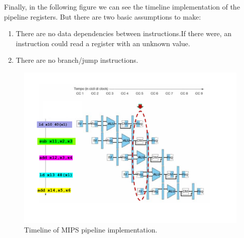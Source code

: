 \documentclass[a4paper]{article}
\begin{document}
    \noindent
    Finally, in the following figure we can see the timeline implementation of the pipeline registers. But there are two basic assumptions to make:
    \begin{enumerate}
        \item There are no data dependencies between instructions.If there were, an instruction could read a register with an unknown value.

        \item There are no branch/jump instructions.
    \end{enumerate}
    \begin{figure}[!htp]
        \centering
        \includegraphics[width=\textwidth]{img/pipeline-registers-2.pdf}
        \caption{Timeline of MIPS pipeline implementation.\cite{pipelining-slides}}
    \end{figure}

    \newpage

    {}
    

    \newpage

    \printindex
\end{document}
